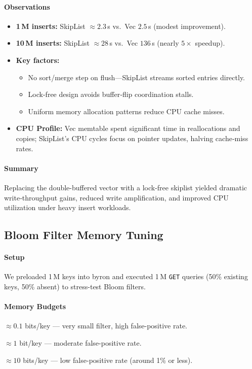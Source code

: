 \documentclass[10pt]{article}
\begin{document}
\paragraph{Observations}
\begin{itemize}[itemsep=0.5ex]
  \item \textbf{1\,M inserts:} SkipList $\approx2.3\,$s vs.\ Vec $2.5\,$s (modest improvement).
  \item \textbf{10\,M inserts:} SkipList $\approx28\,$s vs.\ Vec $136\,$s (nearly $5\times$ speedup).
  \item \textbf{Key factors:}
    \begin{itemize}[itemsep=0.3ex]
      \item No sort/merge step on flush—SkipList streams sorted entries directly.
      \item Lock-free design avoids buffer‐flip coordination stalls.
      \item Uniform memory allocation patterns reduce CPU cache misses.
    \end{itemize}
  \item \textbf{CPU Profile:} Vec memtable spent significant time in reallocations and copies; SkipList’s CPU cycles focus on pointer updates, halving cache‐miss rates.
\end{itemize}

\paragraph{Summary}
Replacing the double-buffered vector with a lock-free skiplist yielded dramatic write‐throughput gains, reduced write amplification, and improved CPU utilization under heavy insert workloads.

\subsection{Bloom Filter Memory Tuning}

\paragraph{Setup}
We preloaded 1\,M keys into byron and executed 1\,M \texttt{GET} queries (50\% existing keys, 50\% absent) to stress-test Bloom filters.

\paragraph{Memory Budgets}
\begin{description}[leftmargin=1em,labelwidth=*,itemsep=0.5ex]
  \item[100\,K bits] $\approx0.1$ bits/key — very small filter, high false-positive rate.
  \item[1\,M bits] $\approx1$ bit/key — moderate false-positive rate.
  \item[10\,M bits] $\approx10$ bits/key — low false-positive rate (around 1\% or less).
\end{description}
\end{document}
